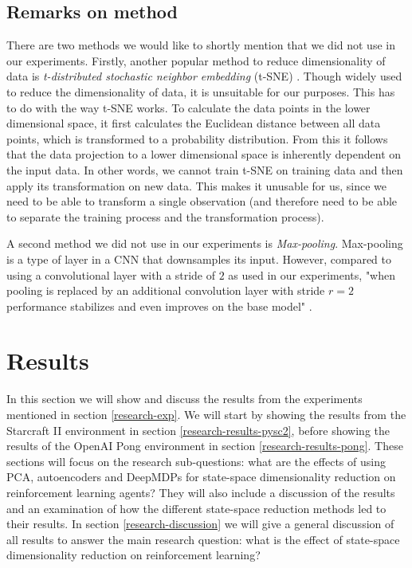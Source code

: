 \subsection{Remarks on method}
There are two methods we would like to shortly mention that we did not use in our experiments. Firstly, another popular method to reduce dimensionality of data is \emph{t-distributed stochastic neighbor embedding} (t-SNE) \cite{tsne}. Though widely used to reduce the dimensionality of data, it is unsuitable for our purposes. This has to do with the way t-SNE works. To calculate the data points in the lower dimensional space, it first calculates the Euclidean distance between all data points, which is transformed to a probability distribution. From this it follows that the data projection to a lower dimensional space is inherently dependent on the input data. In other words, we cannot train t-SNE on training data and then apply its transformation on new data. This makes it unusable for us, since we need to be able to transform a single observation (and therefore need to be able to separate the training process and the transformation process). 

A second method we did not use in our experiments is \emph{Max-pooling}. Max-pooling is a type of layer in a CNN that downsamples its input. However, compared to using a convolutional layer with a stride of $2$ as used in our experiments, "when pooling is replaced by an additional convolution layer with stride $r = 2$ performance stabilizes and even improves on the base model" \cite{maxvsconv}.
 

\section{Results}\label{research-results}
In this section we will show and discuss the results from the experiments mentioned in section \ref{research-exp}. We will start by showing the results from the Starcraft II environment in section \ref{research-results-pysc2}, before showing the results of the OpenAI Pong environment in section \ref{research-results-pong}. These sections will focus on the research sub-questions: what are the effects of using PCA, autoencoders and DeepMDPs for state-space dimensionality reduction on reinforcement learning agents? They will also include a discussion of the results and an examination of how the different state-space reduction methods led to their results. In section \ref{research-discussion} we will give a general discussion of all results to answer the main research question: what is the effect of state-space dimensionality reduction on reinforcement learning?

